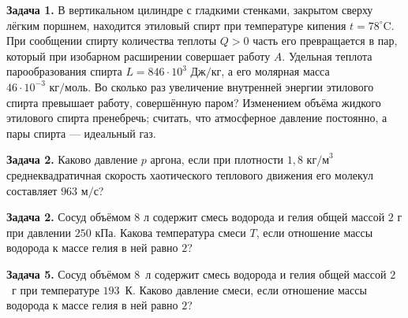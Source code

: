 \begin{taskbasic}[code={\label{task:mkt_gas_v13_n24}}]
\textbf{Задача 1.} В вертикальном цилиндре с гладкими стенками, закрытом сверху лёгким поршнем, находится этиловый спирт при температуре кипения $t = 78^{\circ}\text{C}$. При сообщении спирту количества теплоты $Q > 0$ часть его превращается в пар, который при изобарном расширении совершает работу $A$. Удельная теплота парообразования спирта $L = 846\cdot10^3\text{ Дж/кг}$, а его молярная масса $46\cdot10^{-3}\text{ кг/моль}$. Во сколько раз увеличение внутренней энергии этилового спирта превышает работу, совершённую паром? Изменением объёма жидкого этилового спирта пренебречь; считать, что атмосферное давление постоянно, а пары спирта — идеальный газ.

\end{taskbasic}

\begin{taskbasic}[code={\label{task:mkt_gas_v15_n23}}]
\textbf{Задача 2.} Каково давление $p$ аргона, если при плотности $1{,}8\text{ кг/м}^3$ среднеквадратичная скорость хаотического теплового движения его молекул составляет $963\text{ м/с}$?

\end{taskbasic}



\begin{taskbasic}[code={\label{task:mkt_gas_v20_n24}}]
\textbf{Задача 2.} Сосуд объёмом $8\text{ л}$ содержит смесь водорода и гелия общей массой $2\text{ г}$ при давлении $250\text{ кПа}$. Какова температура смеси $T$, если отношение массы водорода к массе гелия в ней равно $2$?

\end{taskbasic}



\begin{taskbasic}[code={\label{task:mkt_gas_v29_n24}}]
\textbf{Задача 5.} Сосуд объёмом $8$~л содержит смесь водорода и гелия общей массой $2$~г при температуре $193$~К. Каково давление смеси, если отношение массы водорода к массе гелия в ней равно $2$?

\end{taskbasic}
